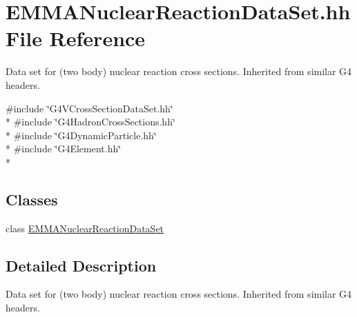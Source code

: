 \hypertarget{EMMANuclearReactionDataSet_8hh}{\section{E\-M\-M\-A\-Nuclear\-Reaction\-Data\-Set.\-hh File Reference}
\label{EMMANuclearReactionDataSet_8hh}
}


Data set for (two body) nuclear reaction cross sections. Inherited from similar G4 headers.  


{\ttfamily \#include \char`\"{}G4\-V\-Cross\-Section\-Data\-Set.\-hh\char`\"{}}\\*
{\ttfamily \#include \char`\"{}G4\-Hadron\-Cross\-Sections.\-hh\char`\"{}}\\*
{\ttfamily \#include \char`\"{}G4\-Dynamic\-Particle.\-hh\char`\"{}}\\*
{\ttfamily \#include \char`\"{}G4\-Element.\-hh\char`\"{}}\\*
\subsection*{Classes}
\begin{DoxyCompactItemize}
\item 
class \hyperlink{classEMMANuclearReactionDataSet}{E\-M\-M\-A\-Nuclear\-Reaction\-Data\-Set}
\end{DoxyCompactItemize}


\subsection{Detailed Description}
Data set for (two body) nuclear reaction cross sections. Inherited from similar G4 headers. 